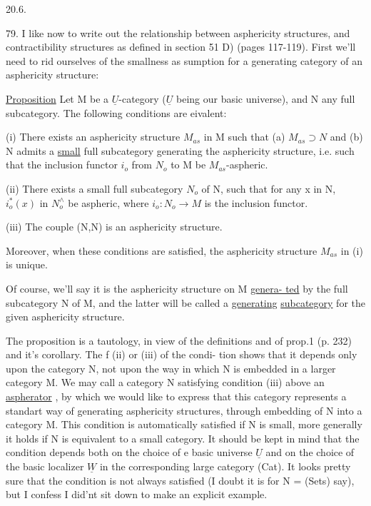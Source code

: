 20.6.

79. I  like now to write out the relationship between asphericity
structures, and contractibility structures as defined in section 51 D)
(pages 117-119). First we'll need to rid ourselves of the smallness as%
sumption for a generating category of an asphericity structure:

\uline{Proposition} Let M be a $\underline{U}$-category ($\underline{U}$ being our basic universe), and N
any full subcategory. The following conditions are eivalent:

(i) There exists an asphericity structure $M_{as}$ in M such that
(a) $M_{as}\supset N$ and (b) N admits a \uline{small} full subcategory generating
the asphericity structure, i.e. such that the inclusion functor $i_o$ from
$N_o$ to M be $M_{as}$-aspheric.

(ii) There exists a small full subcategory $N_o$ of N, such that for
any x in N, $i_o^{*}(x)$ in $N_o^{\wedge}$ be aspheric, where $i_o : N_o \to M$ is the inclusion
functor.

(iii) The couple (N,N) is an asphericity structure.

Moreover, when these conditions are satisfied, the asphericity
structure $M_{as}$ in (i) is unique.

Of course, we'll say it is the asphericity structure on M \uline{genera-%
ted} by the full subcategory N of M, and the latter will be called a
\uline{generating} \uline{subcategory} for the given asphericity structure.

The proposition is a tautology, in view of the definitions and of
prop.1 (p. 232) and it's corollary. The f (ii) or (iii) of the condi-%
tion shows that it depends only upon the category N, not upon the way
in which N is embedded in a larger category M. We may call a category N
satisfying condition (iii) above an \uline{aspherator} , by which we would like
to express that this category represents a standart way of generating
asphericity structures, through  embedding of N into a category M.
This condition is automatically satisfied if N is small, more generally
it holds if N is equivalent to a small category. It should be kept in
mind that the condition depends both on the choice of e basic universe
$\underline{U}$ and on the choice of the basic localizer $\underline{W}$ in the corresponding large
category (Cat). It looks pretty sure that the condition is not always
satisfied (I doubt it is for N = (Sets) say), but I confess I did'nt
sit down to make an explicit example.

